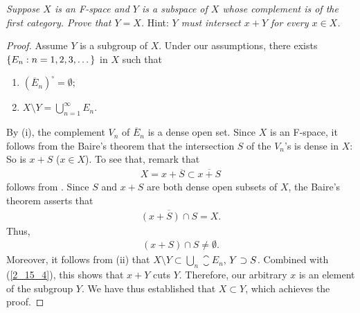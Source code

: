 \textit{%
Suppose $X$ is an F-space and $Y$ is a subspace of $X$ %
whose complement is of the first category. %
Prove that $Y=X$. }Hint: \textit{%
%
  $Y$ must intersect $x+Y$ for every $x\in X$. %
%
}
%
\begin{proof} Assume $Y$ is a subgroup of $X$. %
Under our assumptions, %
there exists $\{E_n: n=1, 2, 3, \dots\}$ in $X$ such that %
%
  \renewcommand{\labelenumi}{(\roman{enumi})} 
  \begin{enumerate}
    \item ${(\overline{E}_n)}^\circ=\emptyset ;$
    \item $X\setminus Y = \displaystyle{\bigcup_{n=1}^\infty  E_n}$.
  \end{enumerate}
%
By (i), the complement $V_n$ of $\overline{E}_n$ is a dense open set. %
Since $X$ is an F-space, it follows from the Baire's theorem that %
%
  the intersection $S$ of the $V_n$'s is dense in $X$:  %
%
So is $x+S$ ($x\in X$). To see that, remark that %
%
  \begin{align}\label{2_15_2}
    X = x + \overline{S} \subset \overline{x + S}
  \end{align} 
%
follows from . %
Since $S$ and $x+S$ are both dense open subsets of $X$, %
the Baire's theorem asserts that %
%
  \begin{align}
    \overline{(x+S)\cap S} = X.
  \end{align} 
%
Thus, 
%
  \begin{align}\label{2_15_4}
    (x+S)\cap S\neq\emptyset.
  \end{align}
%
Moreover, it follows from (ii) that %
%
  $X\setminus Y \subset \bigcup_n \closure{E}_n$, \ie 
  $Y \supset S$. %
Combined with (\ref{2_15_4}), this shows that $x+Y$ cuts $Y$. 
Therefore, our arbitrary $x$ is an element of the subgroup $Y$. %
We have thus established that $X \subset Y$, which achieves the proof.
\end{proof}
\renewcommand{\labelenumi}{(\alph{enumi})} 
%

